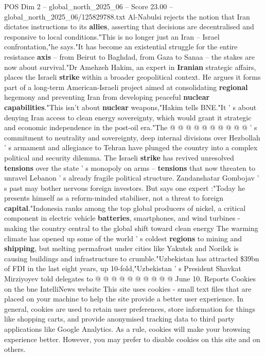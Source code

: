\begin{textsample}{POS Dim 2 – global\_north\_2025\_06 – Score 23.00 – global\_north\_2025\_06/125829788.txt}
Al-Nabulsi rejects the notion that Iran dictates instructions to its \textbf{allies}, asserting that decisions are decentralised and responsive to local conditions."This is no longer just an Iran -- Israel confrontation,"he says."It has become an existential struggle for the entire resistance \textbf{axis} -- from Beirut to Baghdad, from Gaza to Sanaa -- the stakes are now about survival."Dr Amehzeh Hakim, an expert in \textbf{Iranian} strategic affairs, places the Israeli \textbf{strike} within a broader geopolitical context.
He argues it forms part of a long-term American-Israeli project aimed at consolidating \textbf{regional} hegemony and preventing Iran from developing peaceful \textbf{nuclear} \textbf{capabilities}."This isn't about \textbf{nuclear} weapons,"Hakim tells BNE."It ' s about denying Iran access to clean energy sovereignty, which would grant it strategic and economic independence in the post-oil era."The @ @ @ @ @ @ @ @ @ @ ' s commitment to neutrality and sovereignty, deep internal divisions over Hezbollah ' s armament and allegiance to Tehran have plunged the country into a complex political and security dilemma.
The Israeli \textbf{strike} has revived unresolved \textbf{tensions} over the state ' s monopoly on arms -- \textbf{tensions} that now threaten to unravel Lebanon ' s already fragile political structure.
Zandanshatar Gombojav ' s past may bother nervous foreign investors.
But says one expert :"Today he presents himself as a reform-minded stabiliser, not a threat to foreign \textbf{capital}."Indonesia ranks among the top global producers of nickel, a critical component in electric vehicle \textbf{batteries}, smartphones, and wind turbines - making the country central to the global shift toward clean energy The warming climate has opened up some of the world ' s coldest \textbf{regions} to mining and \textbf{shipping}, but melting permafrost under cities like Yakutsk and Norilsk is causing buildings and infrastructure to crumble."Uzbekistan has attracted \$39bn of FDI in the last eight years, up 10-fold,"Uzbekistan ' s President Shavkat Mirziyoyev told delegates to @ @ @ @ @ @ @ @ @ @ June 10.
Reports Cookies on the bne IntelliNews website This site uses cookies - small text files that are placed on your machine to help the site provide a better user experience.
In general, cookies are used to retain user preferences, store information for things like shopping carts, and provide anonymised tracking data to third party applications like Google Analytics.
As a rule, cookies will make your browsing experience better.
However, you may prefer to disable cookies on this site and on others.

\end{textsample}
